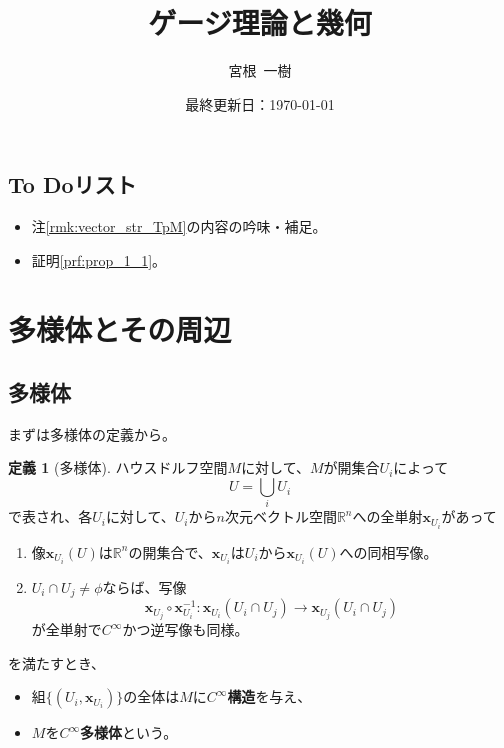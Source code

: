 \documentclass[unicode,a4paper,11pt]{ltjsarticle}
\title{
  ゲージ理論と幾何
}
\author{
  宮根\ 一樹
}
\date{最終更新日：\today}
\theoremstyle{definition}
\newtheorem{dfn}{定義}[section]
\begin{document}
\maketitle
\tableofcontents

\vspace*{5pt}

\subsection*{To Doリスト}

\begin{itemize}
  \item
        注\ref{rmk:vector_str_TpM}の内容の吟味・補足。
  \item
        証明\ref{prf:prop_1_1}。
\end{itemize}

\clearpage
\section{多様体とその周辺}

\subsection{多様体}

まずは多様体の定義から。

\begin{dfn}[多様体]
  ハウスドルフ空間$M$に対して、$M$が開集合$U_{i}$によって
  \begin{equation}
    U
    =
    \bigcup_{i}U_{i}
  \end{equation}
  で表され、各$U_{i}$に対して、$U_{i}$から$n$次元ベクトル空間$\mathbb{R}^{n}$への全単射$\bm{x}_{U_{i}}$があって
  \begin{enumerate}
    \item
          像$\bm{x}_{U_{i}}(U)$は$\mathbb{R}^{n}$の開集合で、$\bm{x}_{U_{i}}$は$U_{i}$から$\bm{x}_{U_{i}}(U)$への同相写像。
    \item
          $U_{i}\cap U_{j}\neq\phi$ならば、写像
          \begin{equation}
            \bm{x}_{U_{j}}\circ\bm{x}_{U_{i}}^{-1}
            :
            \bm{x}_{U_{i}}(U_{i}\cap U_{j})\rightarrow\bm{x}_{U_{j}}(U_{i}\cap U_{j})
          \end{equation}
          が全単射で$C^{\infty}$かつ逆写像も同様。
  \end{enumerate}
  を満たすとき、
  \begin{itemize}
    \item
          組$\{(U_{i},\bm{x}_{U_{i}})\}$の全体は$M$に\textbf{$C^{\infty}$構造}を与え、
    \item
          $M$を\textbf{$C^{\infty}$多様体}という。
  \end{itemize}
\end{dfn}
\end{document}
